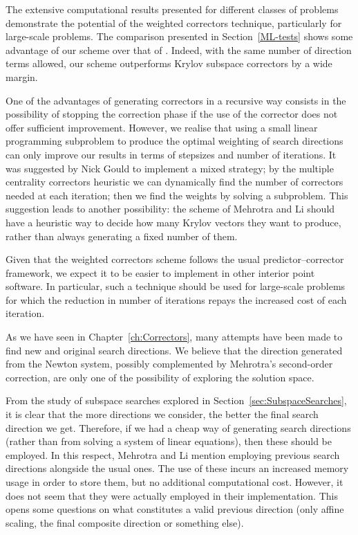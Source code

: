 The extensive computational results presented for different 
classes of problems demonstrate the potential of the
weighted correctors technique, particularly for large-scale problems.
The comparison presented in Section~\ref{ML-tests} 
shows some advantage
of our scheme over that of \cite{MehrotraLi}. Indeed, with the same 
number of direction terms allowed, our scheme outperforms Krylov subspace 
correctors by a wide margin.

One of the advantages of generating correctors in a recursive way
consists in the possibility of stopping the correction phase
if the use of the corrector does not offer sufficient improvement.
However, we realise that using a small linear programming subproblem
to produce the optimal weighting of search directions can only improve
our results in terms of stepsizes and number of iterations.
It was suggested by Nick Gould to implement a mixed strategy;
by the multiple centrality correctors heuristic we can dynamically
find the number of correctors needed at each iteration; then we find
the weights by solving a subproblem.
This suggestion leads to another possibility: the scheme of
Mehrotra and Li should have a heuristic way to decide how many
Krylov vectors they want to produce, rather than always generating
a fixed number of them.

Given that the weighted correctors scheme follows the usual 
predictor--corrector framework,
we expect it to be easier to implement in other interior point software.
In particular, such a technique should be used for large-scale problems
for which the reduction in number of iterations repays the
increased cost of each iteration. 

As we have seen in Chapter~\ref{ch:Correctors}, many attempts
have been made to find new and original search directions.
We believe that the direction generated from the Newton system,
possibly complemented by Mehrotra's second-order correction,
are only one of the possibility of exploring the solution space.

From the study of subspace searches explored in
Section~\ref{sec:SubspaceSearches}, it is clear that the more 
directions we consider, the better the final search direction 
we get. Therefore, if we had a cheap way of generating search
directions (rather than from solving a system of linear equations),
then these should be employed.
In this respect, Mehrotra and Li \cite{MehrotraLi} 
mention employing previous search directions alongside the usual ones. 
The use of these incurs an increased memory usage 
in order to store them, but no additional computational cost.
However, it does not seem that they were actually employed in
their implementation.
This opens some questions on what constitutes a valid
previous direction (only affine scaling, the final composite direction
or something else).

